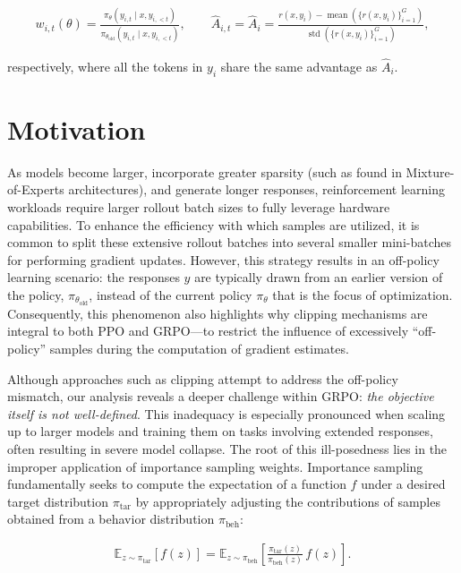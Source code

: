 \begin{align}
    w_{i,t}(\theta) = \frac{ \pi_{\theta}(y_{i,t} \mid x, y_{i,<t}) }{ \pi_{\theta_\text{old}}(y_{i,t} \mid x, y_{i,<t}) },\qquad
    \widehat{A}_{i,t} = \widehat{A}_i = \frac{ r(x, y_i) - \operatorname{mean}\left(\{ r(x, y_i) \}_{i=1}^G\right) }{ \operatorname{std}\left(\{ r(x, y_i) \}_{i=1}^G\right) },
\end{align}

respectively, where all the tokens in $y_i$ share the same advantage as $\widehat{A}_{i}$.

\section{Motivation}
\label{sec:motivation}

As models become larger, incorporate greater sparsity (such as found in Mixture-of-Experts architectures), and generate longer responses, reinforcement learning workloads require larger rollout batch sizes to fully leverage hardware capabilities. To enhance the efficiency with which samples are utilized, it is common to split these extensive rollout batches into several smaller mini-batches for performing gradient updates. However, this strategy results in an off-policy learning scenario: the responses $y$ are typically drawn from an earlier version of the policy, $\pi_{\theta_\text{old}}$, instead of the current policy $\pi_\theta$ that is the focus of optimization. Consequently, this phenomenon also highlights why clipping mechanisms are integral to both PPO and GRPO—to restrict the influence of excessively ``off-policy'' samples during the computation of gradient estimates.

Although approaches such as clipping attempt to address the off-policy mismatch, our analysis reveals a deeper challenge within GRPO: \textit{the objective itself is not well-defined}. This inadequacy is especially pronounced when scaling up to larger models and training them on tasks involving extended responses, often resulting in severe model collapse. The root of this ill-posedness lies in the improper application of importance sampling weights. Importance sampling fundamentally seeks to compute the expectation of a function $f$ under a desired target distribution $\pi_\text{tar}$ by appropriately adjusting the contributions of samples obtained from a behavior distribution $\pi_\text{beh}$:

\begin{align}
\mathbb{E}_{z \sim \pi_\text{tar}} \left[ f(z) \right] = \mathbb{E}_{z \sim \pi_\text{beh}} \left[ \frac{ \pi_\text{tar} (z) }{ \pi_\text{beh} (z)} \, f(z) \right].
\end{align}

